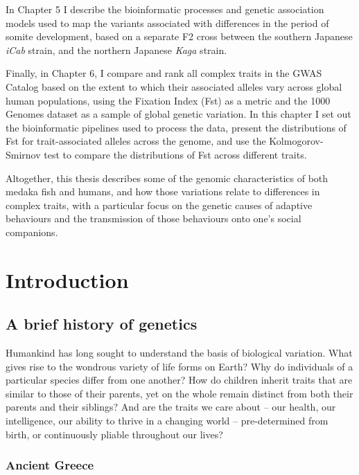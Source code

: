 \documentclass[
]{book}
\begin{document}
In Chapter 5 I describe the bioinformatic processes and genetic association models used to map the variants associated with differences in the period of somite development, based on a separate F2 cross between the southern Japanese \emph{iCab} strain, and the northern Japanese \emph{Kaga} strain.

Finally, in Chapter 6, I compare and rank all complex traits in the GWAS Catalog based on the extent to which their associated alleles vary across global human populations, using the Fixation Index (Fst) as a metric and the 1000 Genomes dataset as a sample of global genetic variation. In this chapter I set out the bioinformatic pipelines used to process the data, present the distributions of Fst for trait-associated alleles across the genome, and use the Kolmogorov-Smirnov test to compare the distributions of Fst across different traits.

Altogether, this thesis describes some of the genomic characteristics of both medaka fish and humans, and how those variations relate to differences in complex traits, with a particular focus on the genetic causes of adaptive behaviours and the transmission of those behaviours onto one's social companions.

\hypertarget{Introduction}{%
\chapter{Introduction}\label{Introduction}}

\hypertarget{a-brief-history-of-genetics}{%
\section{A brief history of genetics}\label{a-brief-history-of-genetics}}

Humankind has long sought to understand the basis of biological variation. What gives rise to the wondrous variety of life forms on Earth? Why do individuals of a particular species differ from one another? How do children inherit traits that are similar to those of their parents, yet on the whole remain distinct from both their parents and their siblings? And are the traits we care about -- our health, our intelligence, our ability to thrive in a changing world -- pre-determined from birth, or continuously pliable throughout our lives?

\hypertarget{ancient-greece}{%
\subsection{Ancient Greece}\label{ancient-greece}}
\end{document}
